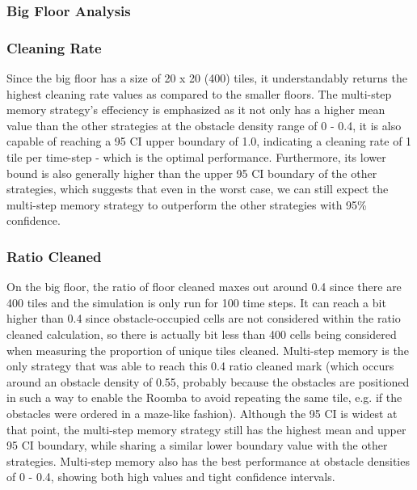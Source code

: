 \documentclass[11pt]{article}
\begin{document}
    
    \begin{center}
    \end{center}

    
    \begin{center}
    \end{center}

    
    \subsubsection{Big Floor Analysis}

    \subsubsection*{Cleaning Rate}

Since the big floor has a size of 20 x 20 (400) tiles, it understandably
returns the highest cleaning rate values as compared to the smaller
floors. The multi-step memory strategy's effeciency is emphasized as it
not only has a higher mean value than the other strategies at the
obstacle density range of 0 - 0.4, it is also capable of reaching a 95
CI upper boundary of 1.0, indicating a cleaning rate of 1 tile per
time-step - which is the optimal performance. Furthermore, its lower
bound is also generally higher than the upper 95 CI boundary of the
other strategies, which suggests that even in the worst case, we can
still expect the multi-step memory strategy to outperform the other
strategies with 95\% confidence.

 \subsubsection*{Ratio Cleaned}

On the big floor, the ratio of floor cleaned maxes out around 0.4 since
there are 400 tiles and the simulation is only run for 100 time steps.
It can reach a bit higher than 0.4 since obstacle-occupied cells are not
considered within the ratio cleaned calculation, so there is actually
bit less than 400 cells being considered when measuring the proportion
of unique tiles cleaned. Multi-step memory is the only strategy that was
able to reach this 0.4 ratio cleaned mark (which occurs around an
obstacle density of 0.55, probably because the obstacles are positioned
in such a way to enable the Roomba to avoid repeating the same tile,
e.g. if the obstacles were ordered in a maze-like fashion). Although the
95 CI is widest at that point, the multi-step memory strategy still has
the highest mean and upper 95 CI boundary, while sharing a similar lower
boundary value with the other strategies. Multi-step memory also has the
best performance at obstacle densities of 0 - 0.4, showing both high
values and tight confidence intervals.
\end{document}
